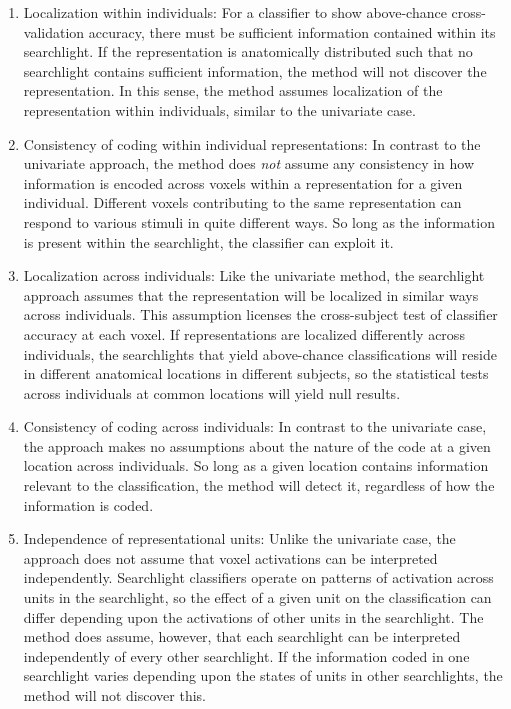 \begin{enumerate}
\item Localization within individuals: For a classifier to show above-chance cross-validation accuracy, there must be sufficient information contained within its searchlight. If the representation is anatomically distributed such that no searchlight contains sufficient information, the method will not discover the representation. In this sense, the method assumes localization of the representation within individuals, similar to the univariate case.

\item Consistency of coding within individual representations: In contrast to the univariate approach, the method does {\em not} assume any consistency in how information is encoded across voxels within a representation for a given individual. Different voxels contributing to the same representation can respond to various stimuli in quite different ways. So long as the information is present within the searchlight, the classifier can exploit it.

\item Localization across individuals: Like the univariate method, the searchlight approach assumes that the representation will be localized in similar ways across individuals. This assumption licenses the cross-subject test of classifier accuracy at each voxel. If representations are localized differently across individuals, the searchlights that yield above-chance classifications will reside in different anatomical locations in different subjects, so the statistical tests across individuals at common locations will yield null results.

\item Consistency of coding across individuals: In contrast to the univariate case, the approach makes no assumptions about the nature of the code at a given location across individuals. So long as a given location contains information relevant to the classification, the method will detect it, regardless of how the information is coded.

\item Independence of representational units: Unlike the univariate case, the approach does not assume that voxel activations can be interpreted independently. Searchlight classifiers operate on patterns of activation across units in the searchlight, so the effect of a given unit on the classification can differ depending upon the activations of other units in the searchlight. The method does assume, however, that each searchlight can be interpreted independently of every other searchlight. If the information coded in one searchlight varies depending upon the states of units in other searchlights, the method will not discover this.
\end{enumerate}

